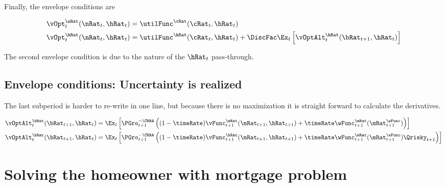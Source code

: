 \documentclass[PortfolioChoiceWithRiskyHousing]{subfiles}
\begin{document}
Finally, the envelope conditions are

\begin{equation}
	\begin{split}
		\vOpt_{t}^{\nRat}(\nRat_{t}, \hRat_{t})  &  = \utilFunc^{\cRat}(\cRat_{t}, \hRat_{t}) \\
		\vOpt_{t}^{\hRat}(\nRat_{t}, \hRat_{t}) & = \utilFunc^{\hRat}(\cRat_{t}, \hRat_{t}) + \DiscFac \Ex_{t} \left[ \vOptAlt_{t}^{\hRat}(\bRat_{t+1}, \hRat_{t}) \right]
	\end{split}
\end{equation}

The second envelope condition is due to the nature of the $\hRat_{t}$ pass-through.

\subsection{Envelope conditions: Uncertainty is realized}

The last subperiod is harder to re-write in one line, but because there is no maximization it is straight forward to calculate the derivatives.

\begin{equation}
	\begin{split}
		\vOptAlt_{t}^{\bRat}(\bRat_{t+1}, \hRat_{t}) & = \Ex_{t} \left[ \PGro_{t+1}^{-\CRRA} \left( (1-\timeRate)\vFunc_{t+1}^{\mRat}(\mRat_{t+1}, \hRat_{t+1}) + \timeRate \wFunc_{t+1}^{\mRat}(\mRat_{t+1}^{\wFunc}) \right) \right] \\
		\vOptAlt_{t}^{\hRat}(\bRat_{t+1}, \hRat_{t} ) & = \Ex_{t} \left[ \PGro_{t+1}^{-\CRRA} \left( (1-\timeRate)\vFunc_{t+1}^{\hRat}(\mRat_{t+1}, \hRat_{t+1}) + \timeRate \wFunc_{t+1}^{\mRat}(\mRat_{t+1}^{\wFunc})\Qrisky_{t+1} \right) \right]
	\end{split}
\end{equation}

\section{Solving the homeowner with mortgage problem}
\end{document}
